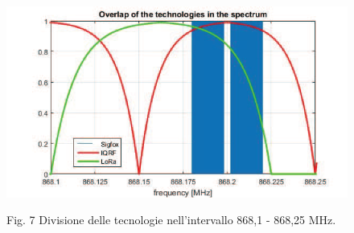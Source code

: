 \documentclass[a4paper]{report} %
\begin{document}
\begin{figure}
\centering
\includegraphics[scale=.5]{Immagini/DivB2.png}

Fig. 7 Divisione delle tecnologie nell'intervallo 868,1 - 868,25 MHz. %
\end{figure}
\end{document}
